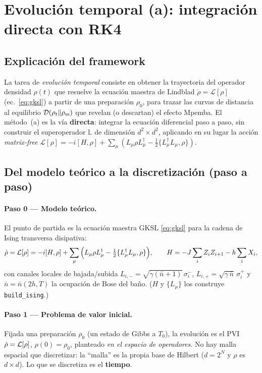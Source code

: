 \section{Evolución temporal (a): integración directa con RK4}
\label{sec:t2a}

\subsection{Explicación del framework}
La tarea de \emph{evolución temporal} consiste en obtener la trayectoria del
operador densidad $\rho(t)$ que resuelve la ecuación maestra de Lindblad
$\dot\rho=\mathcal{L}[\rho]$ (ec.~\eqref{eq:gksl}) a partir de una preparación
$\rho_0$, para trazar las curvas de distancia al equilibrio
$\mathcal{D}(\rho_t\|\rho_{\mathrm{ss}})$ que revelan (o descartan) el efecto Mpemba. El método~(a)
es la vía \textbf{directa}: integrar la ecuación diferencial paso a paso, sin
construir el superoperador $\mathbb{L}$ de dimensión $d^2\times d^2$, aplicando
en su lugar la acción \emph{matrix-free}
$\mathcal{L}[\rho]=-i[H,\rho]+\sum_\mu(L_\mu\rho L_\mu^\dagger-\tfrac12\{L_\mu^\dagger L_\mu,\rho\})$.

\subsection{Del modelo teórico a la discretización (paso a paso)}
\label{ssec:t2a_discr}

\paragraph{Paso 0 — Modelo teórico.} El punto de partida es la ecuación maestra
GKSL \eqref{eq:gksl} para la cadena de Ising transversa disipativa:
\[
\dot\rho=\mathcal{L}[\rho]=-i[H,\rho]+\sum_\mu\Big(L_\mu\rho L_\mu^\dagger-\tfrac12\{L_\mu^\dagger L_\mu,\rho\}\Big),
\qquad
H=-J\sum_i Z_iZ_{i+1}-h\sum_i X_i,
\]
con canales locales de bajada/subida $L_{i,-}=\sqrt{\gamma(\bar n+1)}\,\sigma_i^-$,
$L_{i,+}=\sqrt{\gamma\,\bar n}\,\sigma_i^+$ y $\bar n=\bar n(2h,T)$ la ocupación de
Bose del baño. ($H$ y $\{L_\mu\}$ los construye \texttt{build\_ising}.)

\paragraph{Paso 1 — Problema de valor inicial.} Fijada una preparación $\rho_0$
(un estado de Gibbs a $T_0$), la evolución es el PVI
$\dot\rho=\mathcal{L}[\rho]$, $\rho(0)=\rho_0$, planteado \emph{en el espacio de
operadores}. No hay malla espacial que discretizar: la ``malla'' es la propia
base de Hilbert ($d=2^N$ y $\rho$ es $d\times d$). Lo que se discretiza es el
\textbf{tiempo}.

